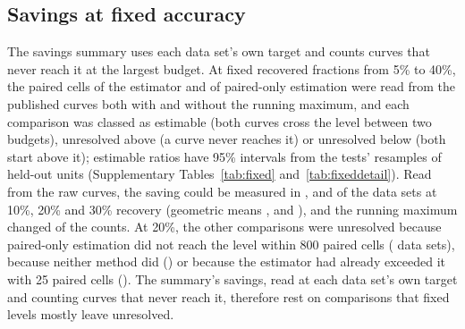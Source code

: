 \begin{table}[h]
\caption{\textbf{A pilot that sets the budget.} For each target and pilot size, over the 29 problems of the prospective test (each weighted alike; problems whose reservoir was too small for a pilot size used the largest pilot allowed, a fifth of the reservoir): the median over problems of each problem's median achieved recovered fraction, with the interquartile range over problems; the share of replicates reaching the target, and the share reaching at least the target less 5 percentage points (overshooting included); the median total budget, pilot included; its median ratio to the paired cells that the observed curve needed (problems whose curve crossed the target); and the share of replicates flagged (no positive signal in the pilot, or a budget beyond the reservoir, so that the whole reservoir was used). All reservoir cells: the budget chosen with the block moments of every reservoir cell.}
\label{tab:pilotdesign}
\centering\scriptsize

\end{table}

\subsection*{Savings at fixed accuracy}
The savings summary uses each data set's own target and counts curves that never reach it at the largest budget. At fixed recovered fractions from 5\% to 40\%, the paired cells of the estimator and of paired-only estimation were read from the published curves both with and without the running maximum, and each comparison was classed as estimable (both curves cross the level between two budgets), unresolved above (a curve never reaches it) or unresolved below (both start above it); estimable ratios have 95\% intervals from the tests' resamples of held-out units (Supplementary Tables~\ref{tab:fixed} and~\ref{tab:fixeddetail}). Read from the raw curves, the saving could be measured in \RvFixedTenN, \RvFixedTwentyN{} and \RvFixedThirtyN{} of the \RvFixedSets{} data sets at 10\%, 20\% and 30\% recovery (geometric means \RvFixedTenGm, \RvFixedTwentyGm{} and \RvFixedThirtyGm), and the running maximum changed \RvFixedSameRunningMax{} of the counts. At 20\%, the other comparisons were unresolved because paired-only estimation did not reach the level within 800 paired cells (\RvFixedTwentyPoAbove{} data sets), because neither method did (\RvFixedTwentyBothAbove) or because the estimator had already exceeded it with 25 paired cells (\RvFixedTwentyEstBelow). The summary's savings, read at each data set's own target and counting curves that never reach it, therefore rest on comparisons that fixed levels mostly leave unresolved.

